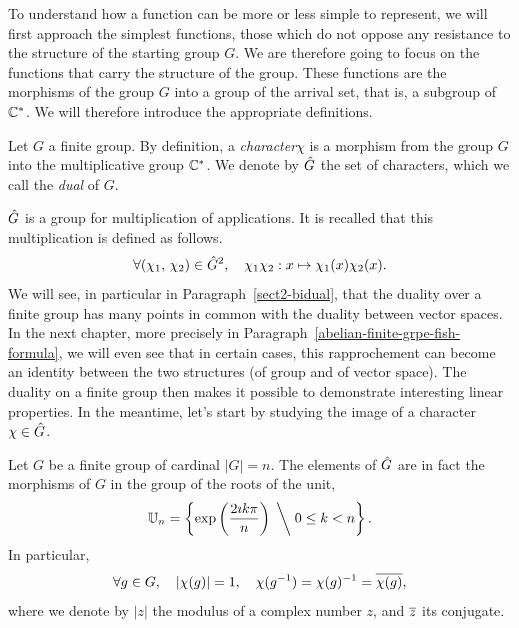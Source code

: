  To understand how a function can be more or less simple to represent, we will first approach the simplest functions, those which do not oppose any resistance to the structure of the starting group $G$. We are therefore going to focus on the functions that carry the structure of the group. These functions are the morphisms of the group $G$ into a group of the arrival set, that is, a subgroup of $\mathbb{C}^*$. We will therefore introduce the appropriate definitions.

\begin{defn}
\label{notation-0} \label{notation-1}    Let $G$ a finite group. By definition, a \textit{character}$\chi$ is a morphism from the group $G$ into the multiplicative group $\mathbb{C}^*$. We denote by $\hat{G}$ the set of characters, which we call the \textit{dual} of $G$.
\end{defn}
$\hat{G}$ is a group for multiplication of applications. It is recalled that this multiplication is defined as follows.
\begin{equation*}
\forall(\chi_1, \, \chi_2) \in \hat{G}^2, \quad \chi_1 \chi_2: x \mapsto \chi_1 (x) \chi_2 (x).
\end{equation*}
We will see, in particular in Paragraph~\ref{sect2-bidual}, that the duality over a finite group has many points in common with the duality between vector spaces. In the next chapter, more precisely in Paragraph~\ref{abelian-finite-grpe-fish-formula}, we will even see that in certain cases, this rapprochement can become an identity between the two structures (of group and of vector space). The duality on a finite group then makes it possible to demonstrate interesting linear properties. In the meantime, let's start by studying the image of a character $\chi \in \hat{G}$.

\begin{prop}
\label{prop-pte-elem-car}
 \label{notation-2} \label{notation-3} \label{notation-4} \label{notation-5} Let $G$ be a finite group of cardinal $|G| = n $. The elements of $\hat{G}$ are in fact the morphisms of $G$ in the group of the  roots of the unit,
\begin{equation*}
\mathbb{U}_n = \left\{\exp \left(\frac{2 \imath k \pi}{n} \right) \; \bigg \backslash \; 0 \leq k <n \right\}.
\end{equation*}
In particular,
\begin{equation*}
\forall g \in G, \quad |\chi(g) | = 1, \quad \chi(g^{-1}) = \chi(g)^{-1} = \overline{\chi(g)},
\end{equation*}
where we denote by $|z|$ the modulus of a complex number $ z $, and $\overline{z}$ its conjugate.
\end{prop}

